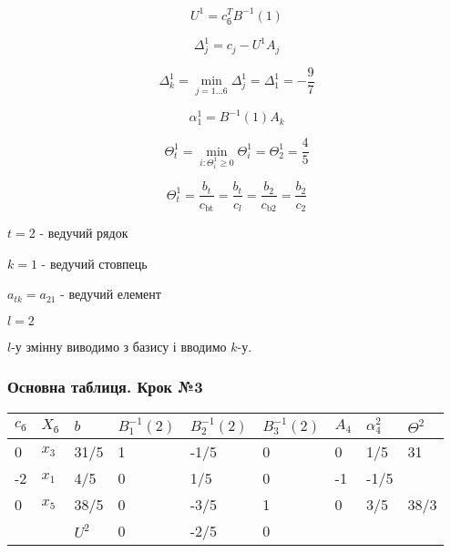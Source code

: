 \documentclass[a4paper, 12pt]{article}
\begin{document}
\begin{equation*}
	U^{1} = c_{\text{б}}^TB^{-1}(1)
\end{equation*}

\begin{equation*}
	\Delta_{j}^{1} = c_j - U^{1}A_{j}
\end{equation*}

\begin{equation*}
	\Delta_{k}^{1} = \min_{j=1 \dots 6} \Delta_{j}^{1} = \Delta_{1}^{1} = -\frac{9}{7}
\end{equation*}

\begin{equation*}
	\alpha_{1}^{1} = B^{-1}(1)A_{k}
\end{equation*}

\begin{equation*}
	\Theta_t^{1} = \min_{i: \Theta_i^{1} \geqslant 0} \Theta_i^{1} = \Theta_2^{1} = \frac{4}{5}
\end{equation*}

\begin{equation*}
	\Theta_t^{1} = \frac{b_t}{c_\text{bt}} = \frac{b_t}{c_l} = \frac{b_2}{c_\text{b2}} = \frac{b_2}{c_\text{2}}
\end{equation*}

$t = 2$ - ведучий рядок

$k = 1$ - ведучий стовпець

$a_{tk} = a_{21}$ - ведучий елемент

$l = 2$

$l$-у змінну виводимо з базису і вводимо $k$-у.

\subsubsection{Основна таблиця. Крок №3}

\begin{table}[H]
    \centering
    \begin{tabular}{|l|l|l|l|l|l|l|l|l|}
    \hline
         $c_\text{б}$ & $X_\text{б}$ & $b$ & $B_{1}^{-1}(2)$ & $B_{2}^{-1}(2)$ & $B_{3}^{-1}(2)$ & $A_{4}$ & $\alpha_{4}^{2}$  & $\Theta^{2}$ \\ \hline
        0 & $x_3$ & 31/5 & 1 & -1/5 & 0 & 0 & 1/5 & 31  \\ \hline
        -2 & $x_1$ & 4/5 & 0 & 1/5 & 0 & -1 & -1/5 & \\ \hline
        0 & $x_5$ & 38/5 & 0 & -3/5 & 1 & 0 & 3/5 & 38/3 \\ \hline
        & & $U^{2}$ & 0 & -2/5 & 0 & & &  \\ \hline
    \end{tabular}
\end{table}
\end{document}
